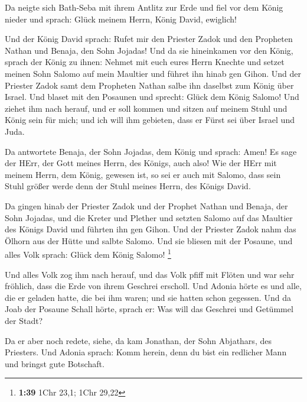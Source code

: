  Da neigte sich Bath-Seba mit ihrem Antlitz zur Erde und
fiel vor dem König nieder und sprach: Glück meinem Herrn, König David,
ewiglich!

 Und der König David sprach: Rufet mir den Priester Zadok
und den Propheten Nathan und Benaja, den Sohn Jojadas! Und da sie
hineinkamen vor den König,  sprach der König zu ihnen:
Nehmet mit euch eures Herrn Knechte und setzet meinen Sohn Salomo auf
mein Maultier und führet ihn hinab gen Gihon.  Und der
Priester Zadok samt dem Propheten Nathan salbe ihn daselbst zum König
über Israel. Und blaset mit den Posaunen und sprecht: Glück dem König
Salomo!  Und ziehet ihm nach herauf, und er soll kommen und
sitzen auf meinem Stuhl und König sein für mich; und ich will ihm
gebieten, dass er Fürst sei über Israel und Juda.

 Da antwortete Benaja, der Sohn Jojadas, dem König und
sprach: Amen! Es sage der HErr, der Gott meines Herrn, des Königs, auch
also!  Wie der HErr mit meinem Herrn, dem König, gewesen
ist, so sei er auch mit Salomo, dass sein Stuhl größer werde denn der
Stuhl meines Herrn, des Königs David.

 Da gingen hinab der Priester Zadok und der Prophet Nathan
und Benaja, der Sohn Jojadas, und die Kreter und Plether und setzten
Salomo auf das Maultier des Königs David und führten ihn gen Gihon.
 Und der Priester Zadok nahm das Ölhorn aus der Hütte und
salbte Salomo. Und sie bliesen mit der Posaune, und alles Volk sprach:
Glück dem König Salomo! \footnote{\textbf{1:39} 1Chr 23,1; 1Chr 29,22}

 Und alles Volk zog ihm nach herauf, und das Volk pfiff mit
Flöten und war sehr fröhlich, dass die Erde von ihrem Geschrei erscholl.
 Und Adonia hörte es und alle, die er geladen hatte, die
bei ihm waren; und sie hatten schon gegessen. Und da Joab der Posaune
Schall hörte, sprach er: Was will das Geschrei und Getümmel der Stadt?

 Da er aber noch redete, siehe, da kam Jonathan, der Sohn
Abjathars, des Priesters. Und Adonia sprach: Komm herein, denn du bist
ein redlicher Mann und bringst gute Botschaft.

